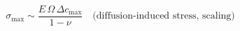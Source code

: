 \documentclass[preview]{standalone}
\begin{document}
\[\sigma_\text{max} \sim \frac{E\,\Omega\,\Delta c_\text{max}}{1-\nu} \quad \text{(diffusion-induced stress, scaling)} \tag{7.6}\]
\end{document}
